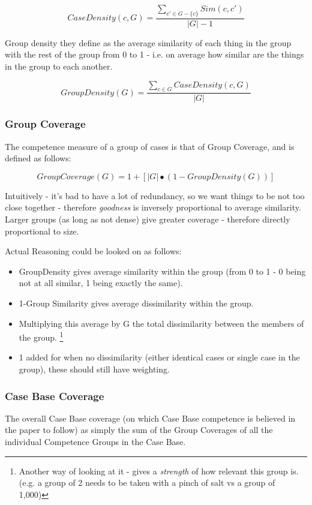 \documentclass[a4paper,11pt]{report}
\begin{document}
\[
CaseDensity(c,G)=\frac{\underset{c'\in G-\{c\}}{\sum}Sim(c,c')}{\left|G\right|-1}
\]

Group density they define as the average similarity of each thing in the group with the rest of the group from 0 to 1 - i.e. on average how similar are the things in the group to each another.

\[
GroupDensity(G)=\frac{\underset{c\in G}{\sum}CaseDensity(c,G)}{\left|G\right|}
\]

\subsubsection{Group Coverage}
The competence measure of a group of cases is that of Group Coverage, and is defined as follows:

\[
GroupCoverage(G)=1+\left[\left|G\right|\bullet(1-GroupDensity(G))\right]
\]

Intuitively - it's bad to have a lot of redundancy, so we want things to be not too close together - therefore \emph{goodness} is inversely proportional to average similarity. Larger groups (as long as not dense) give greater coverage - therefore directly proportional to size.

Actual Reasoning could be looked on as follows:
\begin{itemize}
	\item GroupDensity gives average similarity within the group (from 0 to 1 - 0 being not at all similar, 1 being exactly the same).
	\item 1-Group Similarity gives average dissimilarity within the group.
	\item Multiplying this average by G the total dissimilarity between the members of the group. \footnote{Another way of looking at it - gives a \emph{strength} of how relevant this group is. (e.g. a group of 2 needs to be taken with a pinch of salt vs a group of 1,000)}
	\item 1 added for when no dissimilarity (either identical cases or single case in the group), these should still have weighting.
\end{itemize}

\subsubsection{Case Base Coverage}
The overall Case Base coverage (on which Case Base competence is believed in the paper to follow) as simply the sum of the Group Coverages of all the individual Competence Groups in the Case Base.
\end{document}
